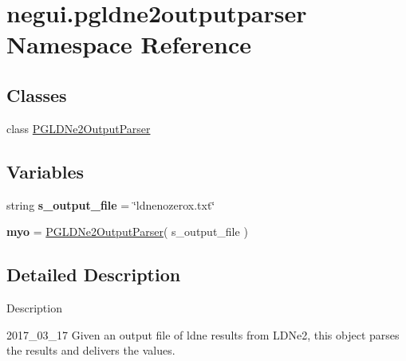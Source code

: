 \hypertarget{namespacenegui_1_1pgldne2outputparser}{}\section{negui.\+pgldne2outputparser Namespace Reference}
\label{namespacenegui_1_1pgldne2outputparser}
\subsection*{Classes}
\begin{DoxyCompactItemize}
\item 
class \hyperlink{classnegui_1_1pgldne2outputparser_1_1PGLDNe2OutputParser}{P\+G\+L\+D\+Ne2\+Output\+Parser}
\end{DoxyCompactItemize}
\subsection*{Variables}
\begin{DoxyCompactItemize}
\item 
string {\bfseries s\+\_\+output\+\_\+file} = \char`\"{}ldnenozerox.\+txt\char`\"{}\hypertarget{namespacenegui_1_1pgldne2outputparser_a9fd3a1aa12b83d4a4f52033ea054b7a0}{}\label{namespacenegui_1_1pgldne2outputparser_a9fd3a1aa12b83d4a4f52033ea054b7a0}

\item 
{\bfseries myo} = \hyperlink{classnegui_1_1pgldne2outputparser_1_1PGLDNe2OutputParser}{P\+G\+L\+D\+Ne2\+Output\+Parser}( s\+\_\+output\+\_\+file )\hypertarget{namespacenegui_1_1pgldne2outputparser_a70dfc56a4128838e86d48d6cad7377fa}{}\label{namespacenegui_1_1pgldne2outputparser_a70dfc56a4128838e86d48d6cad7377fa}

\end{DoxyCompactItemize}


\subsection{Detailed Description}
\begin{DoxyVerb}Description

2017_03_17
Given an output file of ldne results from
LDNe2, this object parses the results and
delivers the values.\end{DoxyVerb}
 